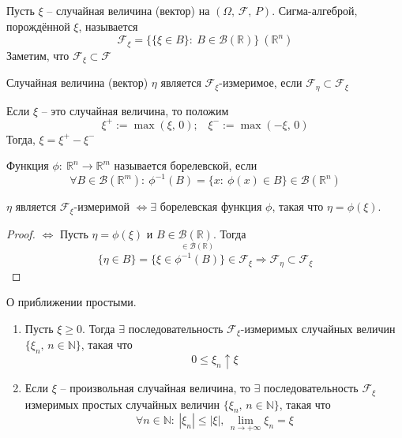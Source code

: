 \begin{definition}
	Пусть $\xi$ -- случайная величина (вектор) на $(\Omega,\, \mathcal{F},\,P)$. Сигма-алгеброй, порождённой $\xi$, называется
	\[\mathcal{F}_\xi = \{\{\xi \in B\} :\: B \in \mathcal{B}(\mathbb{R})\} \: (\mathbb{R}^n)\]
	Заметим, что $\mathcal{F}_\xi \subset \mathcal{F}$
\end{definition}

\begin{definition}
	Случайная величина (вектор) $\eta$ является $\mathcal{F}_\xi$-измеримое, если $\mathcal{F}_\eta \subset \mathcal{F}_\xi$
\end{definition}

\begin{definition}
	Если $\xi$ -- это случайная величина, то положим
	\[\xi^+ := \max(\xi,\, 0);\;\;\; \xi^- := \max(-\xi,\, 0)\]
	Тогда, $\xi = \xi^+ - \xi^-$
\end{definition}

\begin{definition}
	Функция $\phi:\: \mathbb{R}^n \to \mathbb{R}^m$ называется борелевской, если
	\[\forall B \in \mathcal{B}(\mathbb{R}^m) :\: \phi^{-1}(B) = \{x :\: \phi(x) \in B\} \in \mathcal{B}(\mathbb{R}^n)\]
\end{definition}

\begin{lemma} \label{BOREL_MEASURE}
	$\eta$ является $\mathcal{F}_\xi$-измеримой $\Leftrightarrow \exists$ борелевская функция $\phi$, такая что $\eta = \phi(\xi)$.
\end{lemma}

\begin{proof}
	$\Leftrightarrow$ Пусть $\eta = \phi(\xi)$ и $B \in \mathcal{B}(\mathbb{R})$. Тогда
	\[\{\eta \in B\} = \{\xi \in \stackrel{\in \mathcal{B}(\mathbb{R})}{\phi^{-1}(B)}\} \in \mathcal{F}_\xi \Rightarrow \mathcal{F}_\eta \subset \mathcal{F}_\xi\]
\end{proof}

\begin{theorem}
	О приближении простыми.

	\begin{enumerate}
		\item Пусть $\xi \geq 0$. Тогда $\exists$ последовательность $\mathcal{F}_\xi$-измеримых случайных величин $\{\xi_n,\, n \in \mathbb{N}\}$, такая что
		      \[0 \leq \xi_n \uparrow \xi\]
		\item Если $\xi$ -- произвольная случайная величина, то $\exists$ последовательность $\mathcal{F}_\xi$ измеримых простых случайных величин $\{\xi_n,\, n \in \mathbb{N}\}$, такая что
		      \[\forall n \in \mathbb{N}:\: |\xi_n| \leq |\xi|,\, \lim_{n \to +\infty}\xi_n = \xi\]
	\end{enumerate}
\end{theorem}

